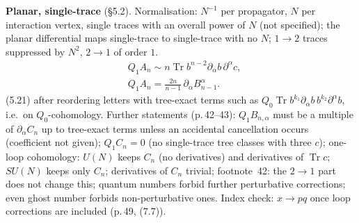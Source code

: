 \documentclass[11pt]{article}
\newcommand{\Tr}{\operatorname{Tr}}
\begin{document}
\textbf{Planar, single-trace} (§5.2). Normalisation: $N^{-1}$ per propagator, $N$ per interaction vertex, single traces with an overall power of $N$ (not specified); the planar differential maps single-trace to single-trace with no $N$; $1\to2$ traces suppressed by $N^2$, $2\to1$ of order $1$.
\begin{align}
&Q_1A_n\sim n\Tr b^{n-2}\partial_\alpha b\,\partial^\alpha c, \tag{5.20}\\
&Q_1A_n=\frac{2n}{n-1}\,\partial_\alpha B^\alpha_{n-1}. \tag{5.21}
\end{align}
(5.21) after reordering letters with tree-exact terms such as $Q_0\Tr b^{k_1}\partial_\alpha b\,b^{k_2}\partial^\alpha b$, i.e.\ on $Q_0$-cohomology. Further statements (p.\,42--43): $Q_1B_{n,\alpha}$ must be a multiple of $\partial_\alpha C_n$ up to tree-exact terms unless an accidental cancellation occurs (coefficient not given); $Q_1C_n=0$ (no single-trace tree classes with three $c$); one-loop cohomology: $U(N)$ keeps $C_n$ (no derivatives) and derivatives of $\Tr c$; $SU(N)$ keeps only $C_n$; derivatives of $C_n$ trivial; footnote~42: the $2\to1$ part does not change this; quantum numbers forbid further perturbative corrections; even ghost number forbids non-perturbative ones. Index check: $x\to pq$ once loop corrections are included (p.\,49, (7.7)).
\end{document}
